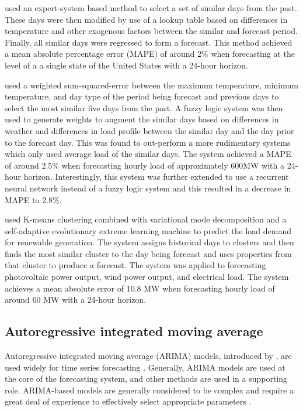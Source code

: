 \citet{Rahman1993} used an expert-system based method to select a set of similar days from the past. 
These days were then modified by use of a lookup table based on differences in temperature and other exogenous factors between the similar and forecast period.
Finally, all similar days were regressed to form a forecast.
This method achieved a mean absolute percentage error (MAPE) of around 2\% when forecasting at the level of a a single state of the United States with a 24-hour horizon.

\citet{Senjyu1998} used a weighted sum-squared-error between the maximum temperature, minimum temperature, and day type of the period being forecast and previous days to select the most similar five days from the past.
A fuzzy logic system was then used to generate weights to augment the similar days based on differences in weather and differences in load profile between the similar day and the day prior to the forecast day.
This was found to out-perform a more rudimentary systems which only used average load of the similar days.
The system achieved a MAPE of around 2.5\% when forecasting hourly load of approximately 600MW with a 24-hour horizon.
Interestingly, this system was further extended \cite{Senjyu2004} to use a recurrent neural network instead of a fuzzy logic system and this resulted in a decrease in MAPE to 2.8\%.

\citet{Dou2018} used K-means clustering combined with variational mode decomposition and a self-adaptive evolutionary extreme learning machine to predict the load demand for renewable generation.
The system assigns historical days to clusters and then finds the most similar cluster to the day being forecast and uses properties from that cluster to produce a forecast.
The system was applied to forecasting photovoltaic power output, wind power output, and electrical load.
The system achieves a mean absolute error of 10.8 MW when forecasting hourly load of around 60 MW with a 24-hour horizon.

\subsection{Autoregressive integrated moving average}
Autoregressive integrated moving average (ARIMA) models, introduced by \citet{Box1970}, are used widely for time series forecasting \citep{Weron2006}. 
Generally, ARIMA models are used at the core of the forecasting system, and other methods are used in a supporting role.
ARIMA-based models are generally considered to be complex and require a great deal of experience to effectively select appropriate parameters \citep{Desouky2000}.

